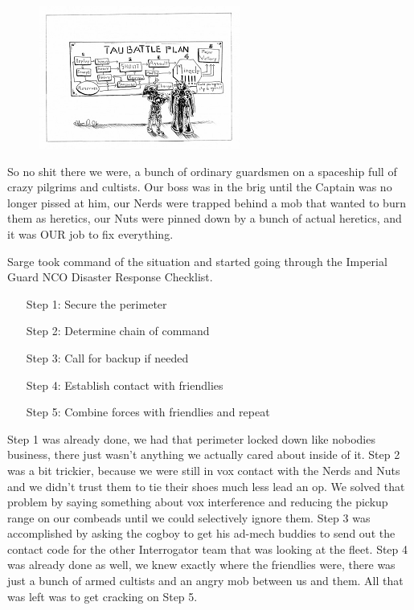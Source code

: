 \begin{figure}
	\begin{center}
		\includegraphics[width=\figwidth]{pics/2/10.png}
	\end{center}
\end{figure}
So no shit there we were, a bunch of ordinary guardsmen on a spaceship full of crazy pilgrims and cultists. 
Our boss was in the brig until the Captain was no longer pissed at him, our Nerds were trapped behind a mob that wanted to burn them as heretics, our Nuts were pinned down by a bunch of actual heretics, and it was OUR job to fix everything. 

Sarge took command of the situation and started going through the Imperial Guard NCO Disaster Response Checklist.
\begin{itemize}
	\item[Step 1:] Secure the perimeter
	\item[Step 2:] Determine chain of command
	\item[Step 3:] Call for backup if needed
	\item[Step 4:] Establish contact with friendlies
	\item[Step 5:] Combine forces with friendlies and repeat
\end{itemize}

Step 1 was already done, we had that perimeter locked down like nobodies business, there just wasn't anything we actually cared about inside of it. 
Step 2 was a bit trickier, because we were still in vox contact with the Nerds and Nuts and we didn't trust them to tie their shoes much less lead an op. 
We solved that problem by saying something about vox interference and reducing the pickup range on our combeads until we could selectively ignore them. 
Step 3 was accomplished by asking the cogboy to get his ad-mech buddies to send out the contact code for the other Interrogator team that was looking at the fleet. 
Step 4 was already done as well, we knew exactly where the friendlies were, there was just a bunch of armed cultists and an angry mob between us and them. 
All that was left was to get cracking on Step 5.

